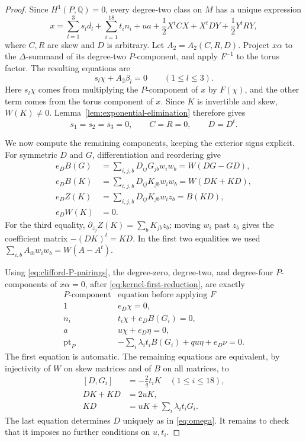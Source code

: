 \documentclass[11pt]{article}
\numberwithin{equation}{section}
\theoremstyle{definition}
\theoremstyle{remark}
\newcommand{\Q}{\mathbb Q}
\newcommand{\pt}{\operatorname{pt}}
\begin{document}
\begin{proof}
Since $H^1(P,\Q)=0$, every degree-two class on $M$ has a unique
expression
\[
 x=\sum_{l=1}^3s_ld_l+\sum_{i=1}^{18}t_in_i+ua
      +\frac12X^tCX+X^tDY+\frac12Y^tRY,
\]
where $C,R$ are skew and $D$ is arbitrary.  Let
$A_2=A_2(C,R,D)$.
Project $x\alpha$ to the $\Delta$-summand of its degree-two
$P$-component, and apply $F^{-1}$ to the torus factor.
The resulting equations are
\[
 s_l\chi+A_2\beta_l=0\qquad(1\le l\le3).
\]
Here $s_l\chi$ comes from multiplying the $P$-component of $x$ by
$F(\chi)$, and the other term comes from the torus component of $x$.
Since $K$ is invertible and skew, $W(K)\ne0$.
Lemma~\ref{lem:exponential-elimination} therefore gives
\begin{equation}\label{eq:kernel-first-reduction}
 s_1=s_2=s_3=0,\qquad C=R=0,\qquad D=D^t.
\end{equation}

We now compute the remaining components, keeping the exterior signs
explicit.  For symmetric $D$ and $G$, differentiation and reordering
give
\[
 \begin{aligned}
 e_DB(G)&=\sum_{i,j,b}D_{ij}G_{jb}w_iw_b
                 =W(DG-GD),\\
 e_DB(K)&=\sum_{i,j,b}D_{ij}K_{jb}w_iw_b
                 =W(DK+KD),\\
 e_DZ(K)&=\sum_{i,j,b}D_{ij}K_{jb}w_iz_b
                 =B(KD),\\
 e_DW(K)&=0.
 \end{aligned}
\]
For the third equality, $\partial_{z_j}Z(K)=\sum_bK_{jb}z_b$;
moving $w_i$ past $z_b$ gives the coefficient matrix
$-(DK)^t=KD$.  In the first two equalities we used
$\sum_{i,b}A_{ib}w_iw_b=W(A-A^t)$.

Using \eqref{eq:clifford-P-pairings}, the degree-zero, degree-two, and
degree-four $P$-components of $x\alpha=0$, after
\eqref{eq:kernel-first-reduction}, are exactly
\[
 \begin{array}{c|l}
 \text{$P$-component}&\text{equation before applying $F$}\\ \hline
 1&e_D\chi=0,\\
 n_i&t_i\chi+e_DB(G_i)=0,\\
 a&u\chi+e_D\eta=0,\\
 \pt_P&-\displaystyle\sum_i\lambda_it_iB(G_i)+qu\eta+e_D\nu=0.
 \end{array}
\]
The first equation is automatic.  The remaining equations are
equivalent, by injectivity of $W$ on skew matrices and of $B$ on all
matrices, to
\begin{equation}\label{eq:kernel-matrix-equations}
 \begin{aligned}
 [D,G_i]&=-\frac2q t_iK\quad(1\le i\le18),\\
 DK+KD&=2uK,\\
 KD&=uK+\sum_i\lambda_it_iG_i.
 \end{aligned}
\end{equation}
The last equation determines $D$ uniquely as in \eqref{eq:omega}.
It remains to check that it imposes no further conditions on $u,t_i$.


\end{proof}
\end{document}
